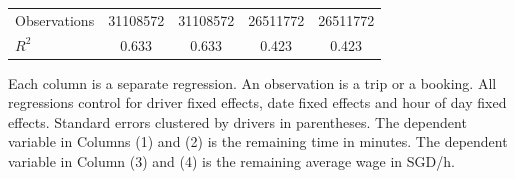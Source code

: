 \documentclass[reviewmode,AEJ]{AEA}
\begin{document}
\begin{table}
{\begin{tabularx}{\textwidth}{l@{\extracolsep{\fill}}*{4}{S}}
		\addlinespace
		Observations        &\num{31108572}         &\num{31108572}         &\num{26511772}         &\num{26511772}         \\
		$R^2$             &     {0.633}         &     {0.633}         &     {0.423}         &     {0.423}         \\
		\bottomrule
		\end{tabularx}
		}

		\begin{tablenotes}
			Each column is a separate regression. An observation is a trip or a booking. All regressions control for driver fixed effects, date fixed effects and hour of day fixed effects. Standard errors clustered by drivers in parentheses. The dependent variable in Columns (1) and (2) is the remaining time in minutes. The dependent variable in Column (3) and (4) is the remaining average wage in SGD/h.
		\end{tablenotes}
\end{table}
\end{document}
